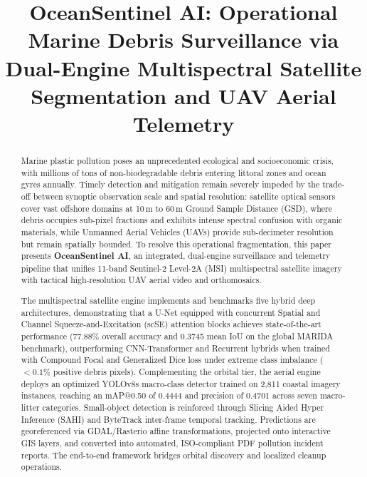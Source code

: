 \documentclass[conference]{IEEEtran}
\begin{document}
\title{OceanSentinel AI: Operational Marine Debris Surveillance via Dual-Engine Multispectral Satellite Segmentation and UAV Aerial Telemetry}

\author{
}

\maketitle

\begin{abstract}
Marine plastic pollution poses an unprecedented ecological and socioeconomic crisis, with millions of tons of non-biodegradable debris entering littoral zones and ocean gyres annually. Timely detection and mitigation remain severely impeded by the trade-off between synoptic observation scale and spatial resolution: satellite optical sensors cover vast offshore domains at 10\,m to 60\,m Ground Sample Distance (GSD), where debris occupies sub-pixel fractions and exhibits intense spectral confusion with organic materials, while Unmanned Aerial Vehicles (UAVs) provide sub-decimeter resolution but remain spatially bounded. To resolve this operational fragmentation, this paper presents \textbf{OceanSentinel AI}, an integrated, dual-engine surveillance and telemetry pipeline that unifies 11-band Sentinel-2 Level-2A (MSI) multispectral satellite imagery with tactical high-resolution UAV aerial video and orthomosaics. 

The multispectral satellite engine implements and benchmarks five hybrid deep architectures, demonstrating that a U-Net equipped with concurrent Spatial and Channel Squeeze-and-Excitation (scSE) attention blocks achieves state-of-the-art performance (77.88\% overall accuracy and 0.3745 mean IoU on the global MARIDA benchmark), outperforming CNN-Transformer and Recurrent hybrids when trained with Compound Focal and Generalized Dice loss under extreme class imbalance ($<0.1\%$ positive debris pixels). Complementing the orbital tier, the aerial engine deploys an optimized YOLOv8s macro-class detector trained on 2,811 coastal imagery instances, reaching an mAP@0.50 of 0.4444 and precision of 0.4701 across seven macro-litter categories. Small-object detection is reinforced through Slicing Aided Hyper Inference (SAHI) and ByteTrack inter-frame temporal tracking. Predictions are georeferenced via GDAL/Rasterio affine transformations, projected onto interactive GIS layers, and converted into automated, ISO-compliant PDF pollution incident reports. The end-to-end framework bridges orbital discovery and localized cleanup operations.
\end{abstract}
\end{document}
